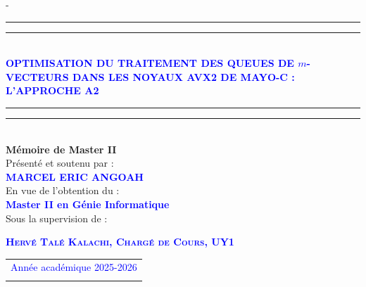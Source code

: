 \begin{titlingpage}
\begin{SingleSpace}
\begin{adjustwidth*}{\unitlength}{-\unitlength}
\begin{center}
\end{center}
\hspace{3cm}
\vspace{0.3cm}
\begin{center}
\rule[0.5ex]{\linewidth}{2pt}\vspace*{-\baselineskip}\vspace*{3.2pt}
\rule[0.6ex]{\linewidth}{1pt}\\[\baselineskip]
{\Large {\textcolor{blue}{\textsc{ \textbf{OPTIMISATION DU TRAITEMENT DES QUEUES DE $m$-VECTEURS
DANS LES NOYAUX AVX2 DE MAYO-C :
L'APPROCHE A2
} }}
} }\\
\rule[0.5ex]{\linewidth}{1pt}\vspace*{-\baselineskip}\vspace{3.2pt}
\rule[0.5ex]{\linewidth}{2pt}\\
\vspace{4mm}
{\Large \textbf{Mémoire de Master II}}\\
\vspace{4mm}
{\Large Présenté et soutenu par : } \\
\vspace{4mm}
{\large \textsc{\textbf{\textcolor{blue}{MARCEL ERIC ANGOAH}}}}\\
\vspace{4mm}
{\Large En vue de l'obtention du :} \\
\vspace{4mm}
{\large \textbf{\textcolor{blue}{Master II en Génie Informatique}}}\\
\vspace{4mm}
{\Large Sous la supervision de :}\\
\vspace{4mm}

{\normalsize \textsc{\textbf{\textcolor{blue}{Hervé Talé Kalachi, Chargé de Cours, UY1}}}}\
\vspace{4mm}

\vspace{6mm}

\vspace{3mm}


\begin{tabular}{c}
{\Large \textcolor{blue}{Année académique 2025-2026}}\\ \\

\end{tabular}


\end{center}
\end{adjustwidth*}
\end{SingleSpace}
\end{titlingpage}
